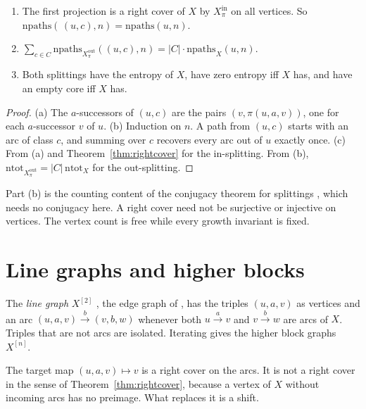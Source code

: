 \begin{theorem}\label{thm:split}
\begin{enumerate}[label=(\alph*)]
\item The first projection is a right cover of \(X\) by \(X_\pi^{\mathrm{in}}\) on all
  vertices. So \(\mathrm{npaths}(\,(u,c),n)=\mathrm{npaths}(u,n)\).
\item \(\sum_{c\in C}\mathrm{npaths}_{X_\pi^{\mathrm{out}}}((u,c),n)=|C|\cdot
  \mathrm{npaths}_X(u,n)\).
\item Both splittings have the entropy of \(X\), have zero entropy iff \(X\) has, and have an
  empty core iff \(X\) has.
\end{enumerate}
\end{theorem}

\begin{proof}
(a) The \(a\)-successors of \((u,c)\) are the pairs \((v,\pi(u,a,v))\), one for each
\(a\)-successor \(v\) of \(u\). (b) Induction on \(n\). A path from \((u,c)\) starts with an arc
of class \(c\), and summing over \(c\) recovers every arc out of \(u\) exactly once. (c) From
(a) and Theorem~\ref{thm:rightcover} for the in-splitting. From (b),
\(\mathrm{ntot}_{X_\pi^{\mathrm{out}}}=|C|\,\mathrm{ntot}_X\) for the out-splitting.
\end{proof}

Part (b) is the counting content of the conjugacy theorem for splittings
\cite[Thm.~2.4.10]{LM95}, which needs no conjugacy here. A right cover need not be surjective
or injective on vertices. The vertex count is free while every growth invariant is fixed.

\section{Line graphs and higher blocks}

\begin{definition}\label{def:linegraph}
The \emph{line graph} \(X^{[2]}\) \cite[§4.5]{BJG09}, the edge graph of
\cite[Def.~2.3.4]{LM95}, has the triples \((u,a,v)\) as vertices and an arc
\((u,a,v)\xrightarrow{b}(v,b,w)\) whenever both \(u\xrightarrow{a}v\) and \(v\xrightarrow{b}w\)
are arcs of \(X\). Triples that are not arcs are isolated. Iterating gives the higher block
graphs \(X^{[n]}\).
\end{definition}

The target map \((u,a,v)\mapsto v\) is a right cover on the arcs. It is not a right cover in
the sense of Theorem~\ref{thm:rightcover}, because a vertex of \(X\) without incoming arcs has no
preimage. What replaces it is a shift.

